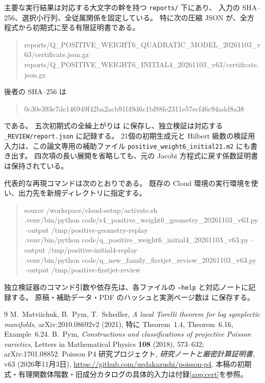 \documentclass[11pt,a4paper]{ltjsarticle}
\theoremstyle{remark}
\begin{document}
主要な実行結果は対応する大文字の幹を持つ \texttt{reports/} 下にあり、
入力の SHA--256、選択小行列、全従属関係を固定している。
特に次の圧縮 JSON が、全方程式から初期式に至る有限証明書である。
\begin{quote}\small\ttfamily
reports/Q\_POSITIVE\_WEIGHT6\_QUADRATIC\_MODEL\_20261103\_v63/certificate.json.gz\\
reports/Q\_POSITIVE\_WEIGHT6\_INITIAL4\_20261103\_v63/certificate.json.gz
\end{quote}
後者の SHA--256 は
\begin{quote}\footnotesize\ttfamily
0c30e393e7de146949f42ba2acb91f49d6c1bf88fe2311e57ecf46c94add8a38
\end{quote}
である。
五次初期式の全繰上がりは
に保存し、独立検証は対応する \texttt{\_REVIEW/report.json} に記録する。
21個の初期生成元と Hilbert 級数の検証用入力は、この論文専用の補助ファイル
\texttt{positive\_weight6\_initial21.m2} にも書き出す。
四次項の長い展開を省略しても、元の Jacobi 方程式に戻す係数証明書は保持されている。

代表的な再現コマンドは次のとおりである。
既存の Cloud 環境の実行環境を使い、出力先を新規ディレクトリに指定する。
\begin{quote}\begin{minipage}{\linewidth}\footnotesize\ttfamily
source /workspace/cloud-setup/activate.sh\\
.venv/bin/python code/r4\_positive\_weight6\_geometry\_20261103\_v63.py
 --output /tmp/positive-geometry-replay\\
.venv/bin/python code/q\_positive\_weight6\_initial4\_20261103\_v63.py
 --output /tmp/positive-initial4-replay\\
.venv/bin/python code/q\_new\_family\_firstjet\_review\_20261103\_v63.py
 --output /tmp/positive-firstjet-review
\end{minipage}\end{quote}
独立検証器のコマンド引数や依存先は、各ファイルの \texttt{--help} と対応ノートに記録する。
原稿・補助データ・PDF のハッシュと実測ページ数は
に保存する。

\begin{thebibliography}{9}
M.~Matviichuk, B.~Pym, T.~Schedler,
\emph{A local Torelli theorem for log symplectic manifolds},
arXiv:2010.08692v2 (2021), 特に Theorem~1.4, Theorem~6.16, Example~6.24.
B.~Pym,
\emph{Constructions and classifications of projective Poisson varieties},
Letters in Mathematical Physics \textbf{108} (2018), 573--632;
arXiv:1701.08852.
Poisson P4 研究プロジェクト,
\emph{研究ノートと厳密計算証明書}, v63 (2026年11月3日),
\url{https://github.com/uedakazushi/poisson-p4}.
本稿の初期式・有理関数体階数・旧成分カタログの具体的入力は付録\ref{app:cert}を参照。
\end{thebibliography}
\end{document}
